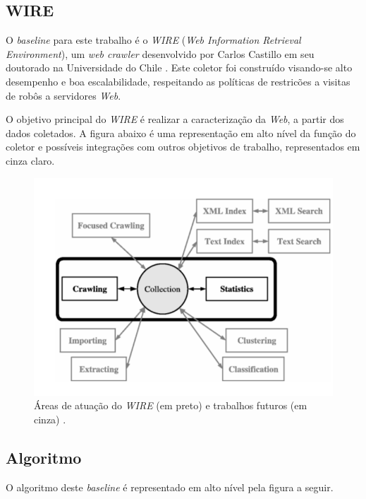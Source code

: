 \documentclass[a4paper,12pt,titlepage]{article}
\begin{document}
\subsection{WIRE}

O \textit{baseline} para este trabalho é o \textit{WIRE} (\textit{Web Information Retrieval Environment}), um \textit{web crawler} desenvolvido por Carlos Castillo em seu doutorado na Universidade do Chile \cite{carlos}. Este coletor foi construído visando-se alto desempenho e boa escalabilidade, respeitando as políticas de restricões a visitas de robôs a servidores \textit{Web}. 

O objetivo principal do \textit{WIRE} é realizar a caracterização da \textit{Web}, a partir dos dados coletados. A figura abaixo é uma representação em alto nível da função do coletor e possíveis integrações com outros objetivos de trabalho, representados em cinza claro.

\begin{figure}[H]
     \centering
     \includegraphics[scale=0.4]{figures/wire-architecture.png}
     \caption{Áreas de atuação do \textit{WIRE} (em preto) e trabalhos futuros (em cinza) \cite{carlos}.}
     \label{bsp}
\end{figure}

\subsection{Algoritmo}

O algoritmo deste \textit{baseline} é representado em alto nível pela figura a seguir.
\end{document}
